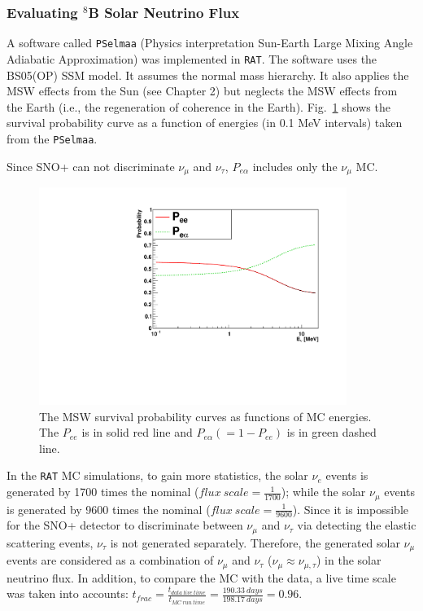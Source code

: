 \subsubsection{Evaluating $^8$B Solar Neutrino Flux}

A software called \texttt{PSelmaa} (Physics interpretation Sun-Earth Large Mixing Angle Adiabatic
Approximation) was implemented in \texttt{RAT}\cite{fady_pselmaa}. The software uses the BS05(OP) SSM model. It assumes the normal mass hierarchy. It also applies the MSW effects from the Sun (see Chapter 2) but neglects the MSW effects from the Earth (i.e., the regeneration of coherence in the Earth). Fig.~\ref{fig:pselmaa_curves} shows the survival probability curve as a function of energies (in 0.1 MeV intervals) taken from the \texttt{PSelmaa}.

Since SNO+ can not discriminate $\nu_\mu$ and $\nu_\tau$, $P_{e\alpha}$ includes only the $\nu_\mu$ MC.

\begin{figure}[!htb]
	\centering
	\includegraphics[width=10cm]{PSelmaa_bs05op.pdf}
	\caption[The MSW survival probability curves as functions of MC energies.]{The MSW survival probability curves as functions of MC energies. The $P_{ee}$ is in solid red line and $P_{e\alpha}(=1-P_{ee})$ is in green dashed line.}
	\label{fig:pselmaa_curves}
\end{figure}


In the \texttt{RAT} MC simulations, to gain more statistics, the solar $\nu_e$ events is generated by 1700 times the nominal ($flux~scale = \frac{1}{1700}$); while the solar $\nu_\mu$ events is generated by 9600 times the nominal ($flux~scale=\frac{1}{9600}$). Since it is impossible for the SNO+ detector to discriminate between $\nu_\mu$ and $\nu_\tau$ via detecting the elastic scattering events, $\nu_\tau$ is not generated separately. Therefore, the generated solar $\nu_\mu$ events are considered as a combination of $\nu_\mu$ and $\nu_\tau$ ($\nu_\mu\approx\nu_{\mu,\tau}$) in the solar neutrino flux. In addition, to compare the MC with the data, a live time scale was taken into accounts: $t_{frac}=\frac{t_{data~live~time}}{t_{MC~run~time}}=\frac{190.33~days}{198.17~days} = 0.96$.

